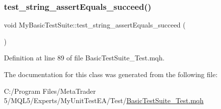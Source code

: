 \mbox{\label{class_my_basic_test_suite_ac6cfe0dda4c123f996129b55fd703865}} 
\subsubsection{\texorpdfstring{test\+\_\+string\+\_\+assert\+Equals\+\_\+succeed()}{test\_string\_assertEquals\_succeed()}}
{\footnotesize\ttfamily void My\+Basic\+Test\+Suite\+::test\+\_\+string\+\_\+assert\+Equals\+\_\+succeed (\begin{DoxyParamCaption}{ }\end{DoxyParamCaption})\hspace{0.3cm}{\ttfamily [inline]}}



Definition at line 89 of file Basic\+Test\+Suite\+\_\+\+Test.\+mqh.



The documentation for this class was generated from the following file\+:\begin{DoxyCompactItemize}
\item 
C\+:/\+Program Files/\+Meta\+Trader 5/\+M\+Q\+L5/\+Experts/\+My\+Unit\+Test\+E\+A/\+Test/\mbox{\hyperlink{_basic_test_suite___test_8mqh}{Basic\+Test\+Suite\+\_\+\+Test.\+mqh}}\end{DoxyCompactItemize}
